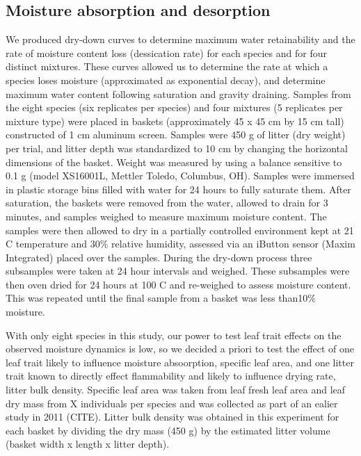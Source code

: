 \documentclass[fire,article,submit,moreauthors,pdftex]{Definitions/mdpi}
\begin{document}
\subsection{Moisture absorption and desorption}


We produced dry-down curves to determine maximum water retainability and the rate of moisture content loss (dessication rate) for each species and for four distinct mixtures. These curves allowed us to  determine the rate at which a species loses moisture (approximated as
exponential decay), and determine maximum water content following saturation
and gravity draining. Samples from the eight species (six replicates per
species) and four mixtures (5 replicates per mixture type) were placed in
baskets (approximately 45 x 45 cm by 15 cm tall) constructed of 1 cm aluminum
screen. Samples were 450 g of litter (dry weight) per trial, and litter depth
was standardized to 10 cm by changing the horizontal dimensions of the basket.
Weight was measured by using a balance sensitive to 0.1 g (model XS16001L,
Mettler Toledo, Columbus, OH). Samples were immersed in plastic storage bins
filled with water for 24 hours to fully saturate them. After saturation, the
baskets were removed from the water, allowed to drain for 3 minutes, and
samples weighed to measure maximum moisture content. The samples were then
allowed to dry in a partially controlled environment kept at 21 C temperature
and 30\% relative humidity, assessed via an iButton sensor (Maxim Integrated)
placed over the samples. During the dry-down process three subsamples were
taken at 24 hour intervals and weighed. These subsamples were then oven dried
for 24 hours at 100 C and re-weighed to assess moisture content. This was
repeated until the final sample from a basket was less than10\% moisture.




With only eight species in this study, our power to test leaf trait effects on the observed moisture dynamics is low, so we decided a priori to test the effect of one leaf trait likely to influence moisture absoorption, specific leaf area, and one litter trait known to directly effect flammability and likely to influence drying rate, litter bulk density. Specific leaf area was taken from leaf fresh leaf area and leaf dry mass from X individuals per species and was collected as part of an ealier study in 2011 (CITE).  Litter bulk density was obtained in this  experiment for each basket by dividing the dry mass (450 g) by the estimated litter volume (basket width x length x litter depth).
\end{document}

